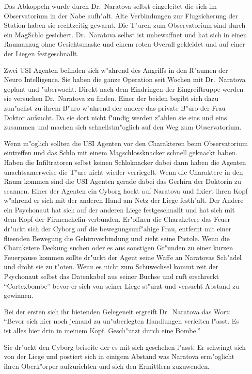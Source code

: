 Das Abkoppeln wurde durch Dr.~Naratova selbst eingeleitet die sich im Observatorium in der Nabe aufh"alt. Alte Verbindungen zur Flugsicherung der Station haben sie rechtzeitig gewarnt. Die T"uren zum Observatorium sind durch ein MagSchlo\3 gesichert. Dr.~Naratova selbst ist unbewaffnet und hat sich in einen Raumanzug ohne Gesichtsmaske und einem roten Overall gekleidet und auf einer der Liegen festgeschnallt.

Zwei USI Agenten befinden sich w"ahrend des Angriffs in den R"aumen der Neuro Intelligence. Sie haben die ganze Operation seit Wochen mit Dr.~Naratova geplant und "uberwacht. Direkt nach dem Eindringen der Eingreiftruppe werden sie versuchen Dr.~Naratova zu finden. Einer der beiden begibt sich dazu zun"achst zu ihrem B"uro w"ahrend der andere das private B"uro der Frau Doktor aufsucht. Da sie dort nicht f"undig werden z"ahlen sie eins und eins zusammen und machen  sich schnellstm"oglich auf den Weg zum Observatorium.

Wenn m"oglich sollten die USI Agenten vor den Charakteren beim Observatorium eintreffen und das Schlo\3 mit einem Magschlossknacker schnell geknackt haben. Haben die Infiltratoren selbst keinen Schlo\3knacker dabei dann haben die Agenten unachtsamerweise die T"ure nicht wieder verriegelt. Wenn die Charaktere in den Raum kommen sind die USI Agenten gerade dabei das Gerhirn der Doktorin zu scannen. Einer der Agenten ein Cyborg hockt auf Naratova und fixiert ihren Kopf w"ahrend er sich mit der anderen Hand am Netz der Liege festh"alt. Der Andere ein Psychonaut hat sich auf der anderen Liege festgeschnallt und hat sich mit dem Kopf der Firmenchefin verbunden. Er"offnen die Charaketere das Feuer dr"uckt sich der Cyborg auf die bewegungsunf"ahige Frau, entfernt mit einer flie\3enden Bewegung die Gehirnverbindung und zieht seine Pistole. Wenn die Charaketere Deckung suchen oder es aus sonstigen Gr"unden zu einer kurzen Feuerpause kommen sollte dr"uckt der Agent seine Waffe an Naratovas Sch"adel und droht sie zu t"oten. Wenn es nicht zum Schu\3wechsel kommt rei\3t der Psychonaut selbst das Datenkabel aus seiner Buchse und ruft erschreckt "`Cortexbombe"' bevor er sich von seiner Liege st"urzt und versucht Abstand zu gewinnen.

Bei der ersten sich ihr bietenden Gelegeneit ergreift Dr.~Naratova das Wort: "`Bevor sich hier noch jemand zu un"uberlegten Handlungen verleiten l"asst. Es ist alles hier drin in meinem Kopf. Gesch"utzt durch eine Bombe."'

Sie dr"uckt den Cyborg beiseite der es mit sich geschehen l"asst. Er schwingt sich von der Liege und postiert sich in einigem Abstand was Naratova erm"oglicht ihren Oberk"orper aufzurichten und sich den Ermittlern zuzuwenden.

